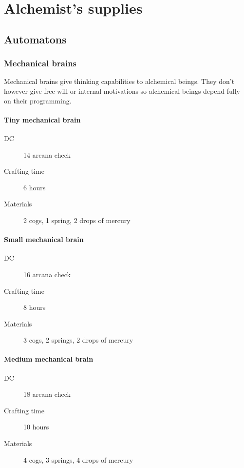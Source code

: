 \chapter{Alchemist's supplies}

\section{Automatons}

\subsection{Mechanical brains}

Mechanical brains give thinking capabilities to alchemical beings. They don't however give free will or internal motivations so alchemical beings
depend fully on their programming.

\subsubsection{Tiny mechanical brain}

\begin{description}
\item [DC] 14 arcana check
\item [Crafting time] 6 hours
\item [Materials] 2 cogs, 1 spring, 2 drops of mercury
\end{description}

\subsubsection{Small mechanical brain}

\begin{description}
\item [DC] 16 arcana check
\item [Crafting time] 8 hours
\item [Materials] 3 cogs, 2 springs, 2 drops of mercury
\end{description}

\subsubsection{Medium mechanical brain}

\begin{description}
\item [DC] 18 arcana check
\item [Crafting time] 10 hours
\item [Materials] 4 cogs, 3 springs, 4 drops of mercury
\end{description}

